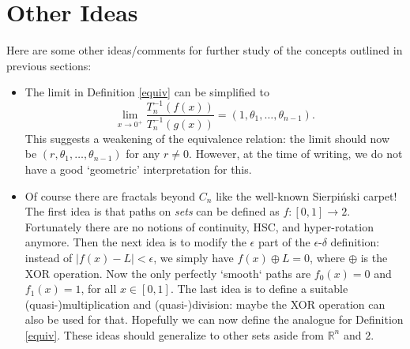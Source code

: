 \documentclass{article}
\theoremstyle{plain}
\begin{document}
\section{Other Ideas}
Here are some other ideas/comments for further study of the concepts outlined in previous sections:
\begin{itemize}
	\item The limit in Definition \ref{equiv} can be simplified to $$\lim_{x \rightarrow 0^+}\frac{T_n^{-1}(f(x))}{T_n^{-1}(g(x))} = (1, \theta_1, \ldots, \theta_{n-1}).$$ This suggests a weakening of the equivalence relation: the limit should now be $(r, \theta_1, \ldots, \theta_{n-1})$ for any $r \ne 0$. However, at the time of writing, we do not have a good `geometric' interpretation for this.
	\item Of course there are fractals beyond $C_n$ like the well-known Sierpiński carpet! The first idea is that paths on \textit{sets} can be defined as $f:[0,1] \rightarrow 2$. Fortunately there are no notions of continuity, HSC, and hyper-rotation anymore. Then the next idea is to modify the $\epsilon$ part of the $\epsilon$-$\delta$ definition: instead of $|f(x)-L|<\epsilon$, we simply have $f(x) \oplus L = 0$, where $\oplus$ is the XOR operation. Now the only perfectly `smooth` paths are $f_0(x)=0$ and $f_1(x)=1$, for all $x\in[0,1]$. The last idea is to define a suitable (quasi-)multiplication and (quasi-)division: maybe the XOR operation can also be used for that. Hopefully we can now define the analogue for Definition \ref{equiv}. These ideas should generalize to other sets aside from $\mathbb{R}^n$ and $2$.
\end{itemize}



\end{document}
